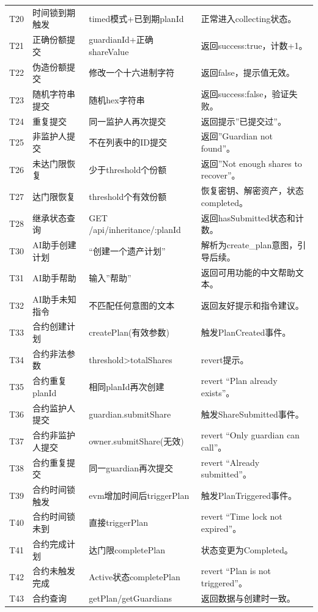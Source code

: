 \documentclass[UTF8,a4paper,zihao=-4,openany]{ctexrep}
\begin{document}
\begin{longtable}{p{1.3cm}p{3.2cm}p{4.2cm}p{5.5cm}}
T20 & 时间锁到期触发 & timed模式+已到期planId & 正常进入collecting状态。\\
T21 & 正确份额提交 & guardianId+正确shareValue & 返回success:true，计数+1。\\
T22 & 伪造份额提交 & 修改一个十六进制字符 & 返回false，提示值无效。\\
T23 & 随机字符串提交 & 随机hex字符串 & 返回success:false，验证失败。\\
T24 & 重复提交 & 同一监护人再次提交 & 返回提示”已提交过”。\\
T25 & 非监护人提交 & 不在列表中的ID提交 & 返回”Guardian not found”。\\
T26 & 未达门限恢复 & 少于threshold个份额 & 返回”Not enough shares to recover”。\\
T27 & 达门限恢复 & threshold个有效份额 & 恢复密钥、解密资产，状态completed。\\
T28 & 继承状态查询 & GET /api/inheritance/:planId & 返回hasSubmitted状态和计数。\\
T30 & AI助手创建计划 & “创建一个遗产计划” & 解析为create\_plan意图，引导后续。\\
T31 & AI助手帮助 & 输入”帮助” & 返回可用功能的中文帮助文本。\\
T32 & AI助手未知指令 & 不匹配任何意图的文本 & 返回友好提示和指令建议。\\
T33 & 合约创建计划 & createPlan(有效参数) & 触发PlanCreated事件。\\
T34 & 合约非法参数 & threshold>totalShares & revert提示。\\
T35 & 合约重复planId & 相同planId再次创建 & revert “Plan already exists”。\\
T36 & 合约监护人提交 & guardian.submitShare & 触发ShareSubmitted事件。\\
T37 & 合约非监护人提交 & owner.submitShare(无效) & revert “Only guardian can call”。\\
T38 & 合约重复提交 & 同一guardian再次提交 & revert “Already submitted”。\\
T39 & 合约时间锁触发 & evm增加时间后triggerPlan & 触发PlanTriggered事件。\\
T40 & 合约时间锁未到 & 直接triggerPlan & revert “Time lock not expired”。\\
T41 & 合约完成计划 & 达门限completePlan & 状态变更为Completed。\\
T42 & 合约未触发完成 & Active状态completePlan & revert “Plan is not triggered”。\\
T43 & 合约查询 & getPlan/getGuardians & 返回数据与创建时一致。\\
\bottomrule
\end{longtable}
\end{document}
